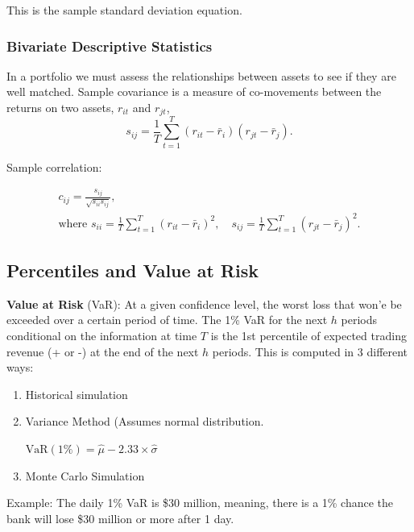 \documentclass[11pt]{article}
\begin{document}
This is the sample standard deviation equation.

\subsubsection{Bivariate Descriptive Statistics}

In a portfolio we must assess the relationships between assets to see if they are well matched. Sample covariance is a measure of co-movements between the returns on two assets, $r_{it}$ and $r_{jt}$,
\begin{equation*}
s_{i j}=\frac{1}{T} \sum_{t=1}^T\left(r_{i t}-\bar{r}_i\right)\left(r_{j t}-\bar{r}_j\right) .
\end{equation*}

Sample correlation:

\begin{equation*}
\begin{gathered}
c_{i j}=\frac{s_{i j}}{\sqrt{s_{i i} s_{i j}}}, \\
\text{where }
s_{i i}=\frac{1}{T} \sum_{t=1}^T\left(r_{i t}-\bar{r}_i\right)^2, \quad s_{i j}=\frac{1}{T} \sum_{t=1}^T\left(r_{j t}-\bar{r}_j\right)^2 .
\end{gathered}
\end{equation*}

\subsection{Percentiles and Value at Risk}

\begin{shaded}
    \textbf{Value at Risk} (VaR): At a given confidence level, the worst loss that won'e be exceeded over a certain period of time. The 1\% VaR for the next $h$ periods conditional on the information at time $T$ is the 1st percentile of expected trading revenue (+ or -) at the end of the next $h$ periods. This is computed in 3 different ways:

    \begin{enumerate}
        \item Historical simulation
        \item Variance Method (Assumes normal distribution. 

        $\text{VaR}(1\%) = \hat{\mu} - 2.33 \times \hat{\sigma}$

        \item Monte Carlo Simulation
    \end{enumerate}

    Example: 
    The daily 1\% VaR is \$30 million, meaning, there is a 1\% chance the bank will lose \$30 million or more after 1 day.
\end{shaded}
\end{document}
